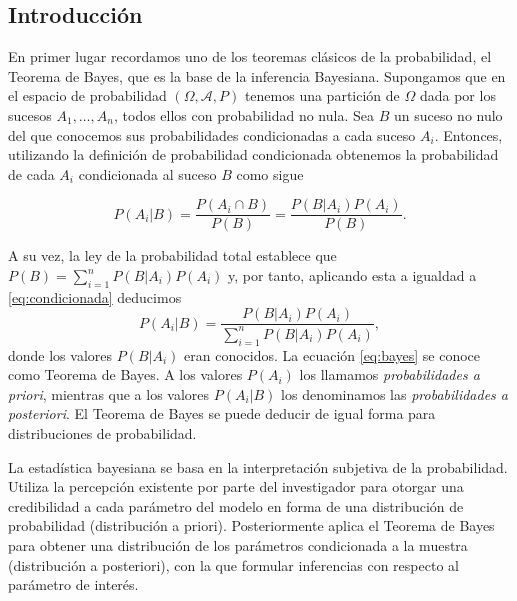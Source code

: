 \documentclass{article}
\begin{document}
\subsection{Introducción}

En primer lugar recordamos uno de los teoremas clásicos de la probabilidad, el Teorema de Bayes, que es la base de la inferencia Bayesiana. Supongamos que en el espacio de probabilidad $(\Omega,\mathcal{A},P)$ tenemos una partición de $\Omega$ dada por los sucesos $A_1,\ldots,A_n$, todos ellos con probabilidad no nula. Sea $B$ un suceso no nulo del que conocemos sus probabilidades condicionadas a cada suceso $A_i$. Entonces, utilizando la definición de probabilidad condicionada obtenemos la probabilidad de cada $A_i$ condicionada al suceso $B$ como sigue

\begin{equation} \label{eq:condicionada}
	P(A_i|B)=\frac{P(A_i\cap B)}{P(B)}=\frac{P(B|A_i)P(A_i)}{P(B)}.
\end{equation}

A su vez, la ley de la probabilidad total establece que $P(B)=\sum_{i=1}^n{P(B|A_i)P(A_i)}$ y, por tanto, aplicando esta a igualdad a \eqref{eq:condicionada} deducimos
\begin{equation} \label{eq:bayes}
	P(A_i|B)=\frac{P(B|A_i)P(A_i)}{\sum_{i=1}^n{P(B|A_i)P(A_i)}},
\end{equation}
donde los valores $P(B|A_i)$ eran conocidos. La ecuación \eqref{eq:bayes} se conoce como Teorema de Bayes. A los valores $P(A_i)$ los llamamos \emph{probabilidades a priori}, mientras que a los valores $P(A_i|B)$ los denominamos las \emph{probabilidades a posteriori}. El Teorema de Bayes se puede deducir de igual forma para distribuciones de probabilidad.

La estadística bayesiana se basa en la interpretación subjetiva de la probabilidad. Utiliza la percepción existente por parte del investigador para otorgar una credibilidad a cada parámetro del modelo en forma de una distribución de probabilidad (distribución a priori). Posteriormente aplica el Teorema de Bayes para obtener una distribución de los parámetros condicionada a la muestra (distribución a posteriori), con la que formular inferencias con respecto al parámetro de interés.
\end{document}
